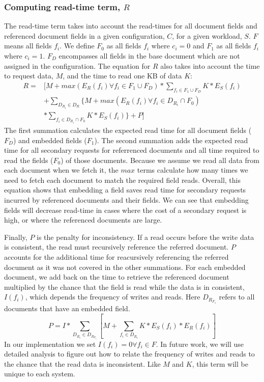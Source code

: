 \subsubsection{Computing read-time term, $R$}
The read-time term takes into account the read-times for all document fields and referenced document fields in a given configuration, $C$, for a given workload, $S$. 
$F$ means all fields $f_i$. 
We define $F_0$ as all fields $f_i$ where $c_i = 0$ and $F_1$ as all fields $f_i$ where $c_i = 1$. $F_D$ encompasses all fields in the base document which are not assigned in the configuration. 
The equation for $R$ also takes into account the time to request data, $M$, and the time to read one KB of data $K$:
\begin{align*}
R =& [M + max(E_R(f_i) \forall f_i \in F_1 \cup F_D)*\sum_{f_i \in F_1 \cup F_D} K*E_S(f_i)\\
& + \sum_{D_{R_i} \in D_R} \{M + max(E_R(f_i) \forall f_i \in D_{R_i} \cap F_0)\\
& * \sum_{f_i \in D_{R_i} \cap F_0} K*E_S(f_i)\} + P]
\end{align*}
The first summation calculates the expected read time for all document fields ($F_D$) and embedded fields ($F_1$). 
The second summation adds the expected read time for all secondary requests for referrenced documents and all time required to read the fields ($F_0$) of those documents. 
Because we assume we read all data from each document when we fetch it, the $max$ terms calculate how many times we need to fetch each document to match the required field reads. 
Overall, this equation shows that embedding a field saves read time for secondary requests incurred by referenced documents and their fields. 
We can see that embedding fields will decrease read-time in cases where the cost of a secondary request is high, or where the referenced documents are large.

Finally, $P$ is the penalty for inconsistency. 
If a read occurs before the write data is consistent, the read must recursively reference the referred document. 
$P$ accounts for the additional time for reacursively referencing the referred document as it was not covered in the other summations. 
For each embedded document, we add back on the time to retrieve the referenced document multiplied by the chance that the field is read while the data is in consistent, $I(f_i)$, which depends the frequency of writes and reads. 
Here $D_{R_{F_1}}$ refers to all documents that have an embedded field. 
$$P = I*\sum_{D_{R_i} \in D_{R_{F_1}}} [M+\sum_{f_i \in D_{R_i}} K*E_S(f_i)*E_R(f_i)]$$
In our implementation we set $I(f_i) = 0 \forall f_i \in F$. 
In future work, we will use detailed analysis to figure out how to relate the frequency of writes and reads to the chance that the read data is inconsistent. 
Like $M$ and $K$, this term will be unique to each system.

